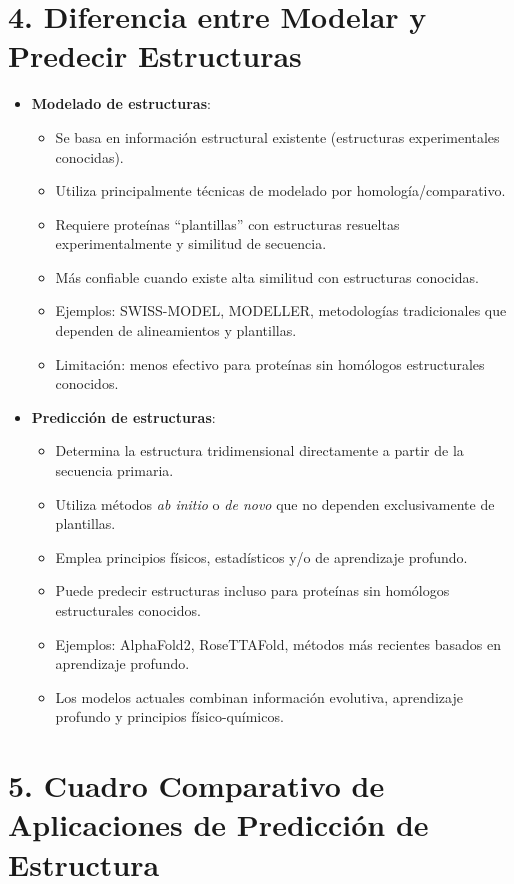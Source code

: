 \documentclass[11pt,a4paper]{article}
\begin{document}
  \section*{4. Diferencia entre Modelar y Predecir Estructuras}
  
  \begin{itemize}[noitemsep,topsep=0pt,leftmargin=*]
    \item \textbf{Modelado de estructuras}:
    \begin{itemize}[noitemsep,topsep=0pt]
      \item Se basa en información estructural existente (estructuras experimentales conocidas).
      \item Utiliza principalmente técnicas de modelado por homología/comparativo.
      \item Requiere proteínas ``plantillas'' con estructuras resueltas experimentalmente y similitud de secuencia.
      \item Más confiable cuando existe alta similitud con estructuras conocidas.
      \item Ejemplos: SWISS-MODEL, MODELLER, metodologías tradicionales que dependen de alineamientos y plantillas.
      \item Limitación: menos efectivo para proteínas sin homólogos estructurales conocidos.
    \end{itemize}
    
    \item \textbf{Predicción de estructuras}:
    \begin{itemize}[noitemsep,topsep=0pt]
      \item Determina la estructura tridimensional directamente a partir de la secuencia primaria.
      \item Utiliza métodos \textit{ab initio} o \textit{de novo} que no dependen exclusivamente de plantillas.
      \item Emplea principios físicos, estadísticos y/o de aprendizaje profundo.
      \item Puede predecir estructuras incluso para proteínas sin homólogos estructurales conocidos.
      \item Ejemplos: AlphaFold2, RoseTTAFold, métodos más recientes basados en aprendizaje profundo.
      \item Los modelos actuales combinan información evolutiva, aprendizaje profundo y principios físico-químicos.
    \end{itemize}
  \end{itemize}
  \section*{5. Cuadro Comparativo de Aplicaciones de Predicción de Estructura}
  
\end{document}

